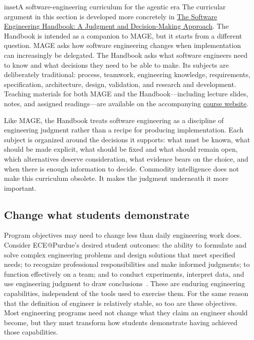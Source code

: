 \begin{bookbox}{inset}{A software-engineering curriculum for the agentic era}
\label{inset-se-handbook-curriculum}
The curricular argument in this section is developed more concretely in \href{https://davisjam.github.io/model-based-agentic-software-engineering/book/se-handbook/index.html}{The Software Engineering Handbook: A Judgment and Decision-Making Approach}. The Handbook is intended as a companion to MAGE, but it starts from a different question. MAGE asks how software engineering changes when implementation can increasingly be delegated. The Handbook asks what software engineers need to know and what decisions they need to be able to make. Its subjects are deliberately traditional: process, teamwork, engineering knowledge, requirements, specification, architecture, design, validation, and research and development. Teaching materials for both MAGE and the Handbook---including lecture slides, notes, and assigned readings---are available on the accompanying \href{https://davisjam.github.io/model-based-agentic-software-engineering/teach/}{course website}.

Like MAGE, the Handbook treats software engineering as a discipline of engineering judgment rather than a recipe for producing implementation. Each subject is organized around the decisions it supports: what must be known, what should be made explicit, what should be fixed and what should remain open, which alternatives deserve consideration, what evidence bears on the choice, and when there is enough information to decide. Commodity intelligence does not make this curriculum obsolete. It makes the judgment underneath it more important.
\end{bookbox}

\subsection{Change what students demonstrate}\label{heading:change-what-students-demonstrate}


Program objectives may need to change less than daily engineering work does. Consider ECE@Purdue's desired student outcomes: the ability to formulate and solve complex engineering problems and design solutions that meet specified needs; to recognize professional responsibilities and make informed judgments; to function effectively on a team; and to conduct experiments, interpret data, and use engineering judgment to draw conclusions~\citep{purdue-ece-student-outcomes}. These are enduring engineering capabilities, independent of the tools used to exercise them. For the same reason that the definition of engineer is relatively stable, so too are these objectives. Most engineering programs need not change what they claim an engineer should become, but they must transform how students demonstrate having achieved those capabilities.

